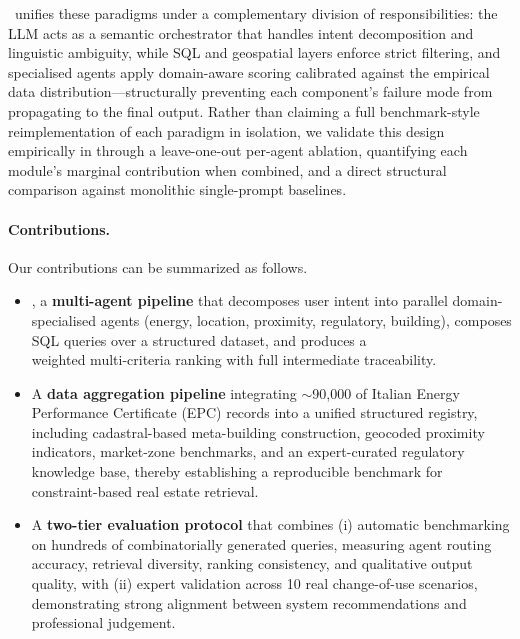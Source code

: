 \documentclass[runningheads,orivec]{llncs}
\begin{document}
\methodACR\ unifies these paradigms under a complementary division of responsibilities: the LLM acts as a semantic orchestrator that handles intent decomposition and linguistic ambiguity, while SQL and geospatial layers enforce strict filtering, and specialised agents apply domain-aware scoring calibrated against the empirical data distribution—structurally preventing each component's failure mode from propagating to the final output.
Rather than claiming a full benchmark-style reimplementation of each paradigm in isolation, we validate this design empirically in  through a leave-one-out per-agent ablation, quantifying each module's marginal contribution when combined, and a direct structural comparison against monolithic single-prompt baselines.

\paragraph{Contributions.} Our contributions can be summarized as follows.
\begin{itemize}
    \item \methodACR, a \textbf{multi-agent pipeline} that decomposes user intent into parallel domain-specialised agents (energy, location, proximity, regulatory, building), composes SQL queries over a structured dataset, and produces a \\weighted multi-criteria ranking with full intermediate traceability.
    
    \item A \textbf{data aggregation pipeline} integrating $\sim$90,000 of Italian Energy Performance Certificate (EPC) records into a unified structured registry, including cadastral-based meta-building construction, geocoded proximity indicators, market-zone benchmarks, and an expert-curated regulatory knowledge base, thereby establishing a reproducible benchmark for constraint-based real estate retrieval.
    
    \item A \textbf{two-tier evaluation protocol} that combines (i) automatic benchmarking on hundreds of combinatorially generated queries, measuring agent routing accuracy, retrieval diversity, ranking consistency, and qualitative output quality, with (ii) expert validation across 10 real change-of-use scenarios, demonstrating strong alignment between system recommendations and professional judgement.
\end{itemize}

\end{document}
